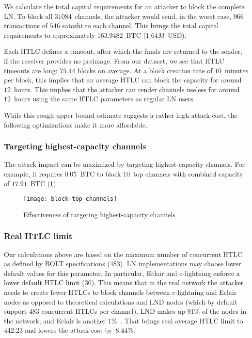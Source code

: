 We calculate the total capital requirements for an attacker to block the complete LN.
To block all $31084$~channels, the attacker would send, in the worst case, $966$ transactions of $546$ satoshi to each channel.
This brings the total capital requirements to approximately $163.9482$~BTC ($1.64M$~USD).

Each HTLC defines a timeout, after which the funds are returned to the sender, if the receiver provides no preimage.
From our dataset, we see that HTLC timeouts are long: $75.44$ blocks on average.
At a block creation rate of $10$~minutes per block, this implies that an average HTLC can block the capacity for around $12$~hours.
This implies that the attacker can render channels useless for around $12$~hours using the same HTLC parameters as regular LN users.


While this rough upper bound estimate suggests a rather high attack cost, the following optimizations make it more affordable.


\subsubsection*{Targeting highest-capacity channels}
The attack impact can be maximized by targeting highest-capacity channels.
For example, it requires $0.05$~BTC to block 10~top channels with combined capacity of $17.91$~BTC (\cref{fig:block-top-channels}).

\begin{figure}[tb]
	\centering
	\texttt{[image: block-top-channels]}
	\caption{Effectiveness of targeting highest-capacity channels.\label{fig:block-top-channels}}
\end{figure}

\subsubsection*{Real HTLC limit}
Our calculations above are based on the maximum number of concurrent HTLC as defined by BOLT specifications ($483$).
LN implementations may choose lower default values for this parameter.
In particular, Eclair and c-lightning enforce a lower default HTLC limit ($30$).
This means that in the real network the attacker needs to create fewer HTLCs to block channels between c-lightning and Eclair nodes as opposed to theoretical calculations and LND nodes (which by default support $483$ concurrent HTLCs per channel).
LND makes up $91\%$ of the nodes in the network, and Eclair is another $1\%$~\cite{Mizrahi2020}.
That brings real average HTLC limit to $442.23$ and lowers the attack cost by~$8.44\%$.

